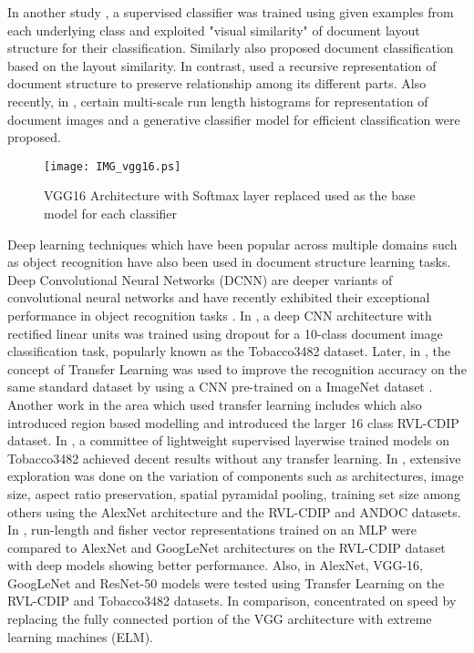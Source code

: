 \documentclass[10pt,conference,a4paper]{IEEEtran}
\begin{document}
In another study \cite{shin2001}, a supervised classifier was trained using  given examples from each underlying class and exploited "visual similarity" of document layout structure for their classification. Similarly \cite{hu2000} also proposed document classification based on the layout similarity. In contrast, \cite{diligenti2003} used a recursive representation of document structure to preserve relationship among its different parts. Also recently, in \cite{gordo2013}, certain multi-scale run length histograms for representation of document images and a generative classifier model for efficient classification were proposed.




\begin{figure}[t]
	\centering
	\texttt{[image: IMG\_vgg16.ps]}
	\caption{VGG16 Architecture with Softmax layer replaced used as the base model for each classifier} \label{fig:DCNNarch}
\end{figure}




Deep learning techniques which have been popular across multiple domains such as object recognition have also been used in document structure learning tasks. Deep Convolutional Neural Networks (DCNN) are deeper variants of convolutional neural networks \cite{lecun1998} and have recently exhibited their exceptional performance in object recognition tasks \cite{Krizhevsky2012,szegedy2015going}. In \cite{kang2014}, a deep CNN architecture with rectified linear units was trained using dropout \cite{Srivastava2014} for a 10-class document image classification task, popularly known as the Tobacco3482 dataset\cite{Kumar2014}. Later, in \cite{afzal2015}, the concept of Transfer Learning \cite{Pan2010} was used to improve the recognition accuracy on the same standard dataset by using a CNN pre-trained on a ImageNet dataset \cite{deng2009}. Another work in the area which used transfer learning includes \cite{harley2015evaluation} which also introduced region based modelling and introduced the larger 16 class RVL-CDIP dataset. In \cite{roy2016generalized}, a committee of lightweight supervised layerwise trained models on Tobacco3482 achieved decent results without any transfer learning. In \cite{tensmeyer2017analysis}, extensive exploration was done on the variation of components such as architectures, image size, aspect ratio preservation, spatial pyramidal pooling, training set size among others using the AlexNet architecture and the RVL-CDIP and ANDOC datasets. In \cite{csurka2016right}, run-length and fisher vector representations trained on an MLP were compared to AlexNet and GoogLeNet architectures on the RVL-CDIP dataset with deep models showing better performance. Also, in \cite{afzal2017cutting} AlexNet, VGG-16, GoogLeNet and ResNet-50 models were tested using Transfer Learning on the RVL-CDIP and Tobacco3482 datasets. In comparison, \cite{kolsch2017real} concentrated on speed by replacing the fully connected portion of the VGG architecture with extreme learning machines (ELM).
\end{document}
